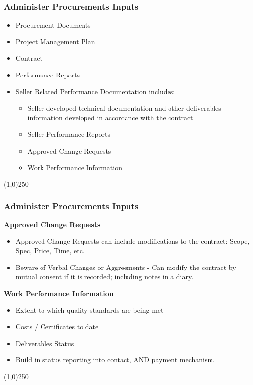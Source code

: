 \begin{frame}
\frametitle{Administer Procurements \hfill\hfill Inputs}

\begin{itemize}
	\item Procurement Documents
	\item Project Management Plan
	\item Contract
	\item Performance Reports
	\item Seller Related Performance Documentation includes:
		\begin{itemize}
			\item Seller-developed technical documentation and other deliverables information developed in accordance with the contract
				\item Seller Performance Reports
				\item Approved Change Requests
				\item Work Performance Information
		\end{itemize}
\end{itemize}
\end{frame}\begin{center}\line(1,0){250}\end{center}




\begin{frame}
\frametitle{Administer Procurements \hfill\hfill Inputs}
\textbf{Approved Change Requests}
	\begin{itemize}
		\item Approved Change Requests can include modifications to the contract: Scope, Spec, Price, Time, etc.
		\item Beware of Verbal Changes or Aggreements - Can modify the contract by mutual consent if it is recorded; including notes in a diary.
	\end{itemize}
\textbf{Work Performance Information}
		\begin{itemize}
			\item Extent to which quality standards are being met
			\item	Costs / Certificates to date
			\item	Deliverables Status
			\item Build in status reporting into contact, AND payment mechanism.
		\end{itemize}
\end{frame}\begin{center}\line(1,0){250}\end{center}




